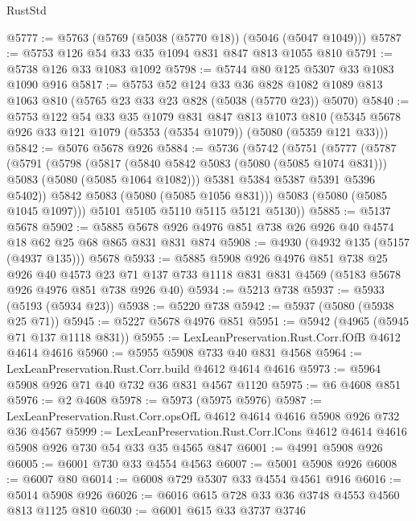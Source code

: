\begin{lexlean}{RustStd}
\begin{coremodule}
{\begin{coremodule}
{{{{{@5777 := @5763 (@5769 (@5038 (@5770 @18)) (@5046 (@5047 @1049)))
@5787 := @5753 @126 @54 @33 @35 @1094 @831 @847 @813 @1055 @810
@5791 := @5738 @126 @33 @1083 @1092
@5798 := @5744 @80 @125 @5307 @33 @1083 @1090 @916
@5817 := @5753
    @52
    @124
    @33
    @36
    @828
    @1082
    @1089
    @813
    @1063
    @810
    (@5765 @23 @33 @23 @828 (@5038 (@5770 @23)) @5070)
@5840 := @5753
    @122
    @54
    @33
    @35
    @1079
    @831
    @847
    @813
    @1073
    @810
    (@5345 @5678 @926 @33 @121 @1079 (@5353 (@5354 @1079)) (@5080 (@5359 @121 @33)))
@5842 := @5076 @5678 @926
@5884 := @5736
    (@5742
      (@5751
        (@5777
          (@5787
            (@5791
              (@5798
                (@5817
                  (@5840 @5842 @5083 (@5080 (@5085 @1074 @831)))
                  @5083
                  (@5080 (@5085 @1064 @1082)))
                @5381
                @5384
                @5387
                @5391
                @5396
                @5402))
            @5842
            @5083
            (@5080 (@5085 @1056 @831)))
          @5083
          (@5080 (@5085 @1045 @1097)))
        @5101
        @5105
        @5110
        @5115
        @5121
        @5130))
@5885 := @5137 @5678
@5902 := @5885 @5678 @926 @4976 @851 @738 @26 @926 @40 @4574 @18 @62 @25 @68 @865 @831 @831 @874
@5908 := @4930 (@4932 @135 (@5157 (@4937 @135))) @5678
@5933 := @5885
    @5908
    @926
    @4976
    @851
    @738
    @25
    @926
    @40
    @4573
    @23
    @71
    @137
    @733
    @1118
    @831
    @831
    @4569
    (@5183 @5678 @926 @4976 @851 @738 @926 @40)
@5934 := @5213 @738
@5937 := @5933 (@5193 (@5934 @23))
@5938 := @5220 @738
@5942 := @5937 (@5080 (@5938 @25 @71))
@5945 := @5227 @5678 @4976 @851
@5951 := @5942 (@4965 (@5945 @71 @137 @1118 @831))
@5955 := LexLeanPreservation.Rust.Corr.fOfB @4612 @4614 @4616
@5960 := @5955 @5908 @733 @40 @831 @4568
@5964 := LexLeanPreservation.Rust.Corr.build @4612 @4614 @4616
@5973 := @5964 @5908 @926 @71 @40 @732 @36 @831 @4567 @1120
@5975 := @6 @4608 @851
@5976 := @2 @4608
@5978 := @5973 (@5975 @5976)
@5987 := LexLeanPreservation.Rust.Corr.opsOfL @4612 @4614 @4616 @5908 @926 @732 @36 @4567
@5999 := LexLeanPreservation.Rust.Corr.lCons
    @4612
    @4614
    @4616
    @5908
    @926
    @730
    @54
    @33
    @35
    @4565
    @847
@6001 := @4991 @5908 @926
@6005 := @6001 @730 @33 @4554 @4563
@6007 := @5001 @5908 @926
@6008 := @6007 @80
@6014 := @6008 @729 @5307 @33 @4554 @4561 @916
@6016 := @5014 @5908 @926
@6026 := @6016 @615 @728 @33 @36 @3748 @4553 @4560 @813 @1125 @810
@6030 := @6001 @615 @33 @3737 @3746
}}}}}
\end{coremodule}}
\end{coremodule}
\end{lexlean}
